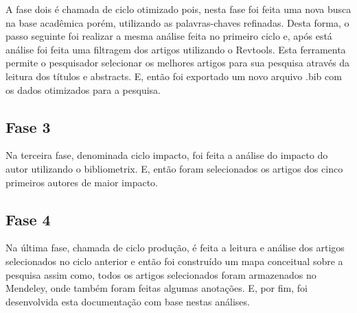 A fase dois é chamada de ciclo otimizado pois, nesta fase foi feita uma nova busca na base acadêmica porém, utilizando as palavras-chaves refinadas. Desta forma, o passo seguinte foi realizar a mesma análise feita no primeiro ciclo e, após está análise foi feita uma filtragem dos artigos utilizando o Revtools. Esta ferramenta permite o pesquisador selecionar os melhores artigos para sua pesquisa através da leitura dos títulos e abstracts. E, então foi exportado um novo arquivo .bib com os dados otimizados para a pesquisa. 

\subsection{Fase 3}
\label{sec:fase3}

Na terceira fase, denominada ciclo impacto, foi feita a análise do impacto do autor utilizando o bibliometrix. E, então foram selecionados os artigos dos cinco primeiros autores de maior impacto.

\subsection{Fase 4}
\label{sec:fase4}

Na última fase, chamada de ciclo produção, é feita a leitura e análise dos artigos selecionados no ciclo anterior e então foi construído um mapa conceitual sobre a pesquisa assim como, todos os artigos selecionados foram armazenados no Mendeley, onde também foram feitas algumas anotações. E, por fim, foi desenvolvida esta documentação com base nestas análises.




